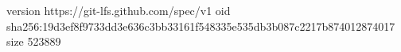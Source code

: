 version https://git-lfs.github.com/spec/v1
oid sha256:19d3ef8f9733dd3e636c3bb33161f548335e535db3b087c2217b874012874017
size 523889
